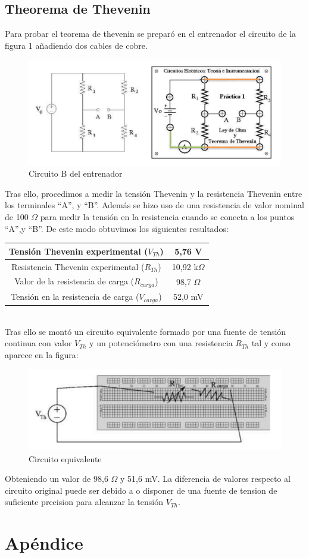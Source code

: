 \documentclass[a4paper,11pt]{article}
\begin{document}
\newpage
\subsection{Theorema de Thevenin}

Para probar el teorema de thevenin se preparó en el entrenador el circuito de la figura 1 añadiendo dos cables de cobre.

\begin{figure}[hbtp]
\centering
\includegraphics[scale=0.5]{Imagenes/Entrenador_B.png}
\caption{Circuito B del entrenador}
\end{figure}

Tras ello, procedimos a medir la tensión Thevenin y la resistencia Thevenin entre los terminales “A”, y “B”. Además se hizo uso de una resistencia de valor nominal de 100 $\Omega$ para medir la tensión en la resistencia cuando se conecta a los puntos “A”,y “B”. De este modo obtuvimos los siguientes resultados:\\

\begin{tabular}{|c|c|}
\hline
Tensión Thevenin experimental ($V_{Th}$) & 5,76 V\\
\hline
Resistencia Thevenin experimental ($R_{Th}$) & 10,92 k$\Omega$ \\
\hline
Valor de la resistencia de carga ($R_{carga}$) & 98,7 $\Omega$ \\
\hline
Tensión en la resistencia de carga ($V_{carga}$)	& 52,0 mV \\
\hline
\end{tabular}\\

Tras ello se montó un circuito equivalente formado por una fuente de tensión continua con valor $V_{Th}$ y un potenciómetro con una resistencia $R_{Th}$ tal y como aparece en la figura:

\begin{figure}[hbtp]
\centering
\includegraphics[scale=0.5]{Imagenes/circuito.png}
\caption{Circuito equivalente}
\end{figure}
Obteniendo un valor de 98,6 $\Omega$ y 51,6 mV. La diferencia de valores respecto al circuito original puede ser debido a o disponer de una fuente de tension de suficiente precision para alcanzar la tensión $V_{Th}$.

\newpage
\section{Apéndice}
\end{document}
